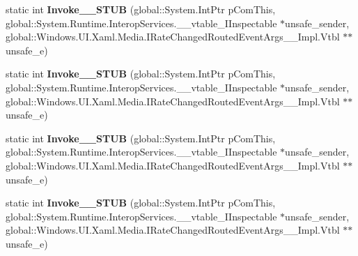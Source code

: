 \begin{DoxyCompactItemize}
\item 
\mbox{\label{struct_windows_1_1_u_i_1_1_xaml_1_1_media_1_1_rate_changed_routed_event_handler_____impl_1_1_vtbl_afcb8aa9c9ec10fdb63e0e499996bd6f5}} 
static int {\bfseries Invoke\+\_\+\+\_\+\+S\+T\+UB} (global\+::\+System.\+Int\+Ptr p\+Com\+This, global\+::\+System.\+Runtime.\+Interop\+Services.\+\_\+\+\_\+vtable\+\_\+\+I\+Inspectable $\ast$unsafe\+\_\+sender, global\+::\+Windows.\+U\+I.\+Xaml.\+Media.\+I\+Rate\+Changed\+Routed\+Event\+Args\+\_\+\+\_\+\+Impl.\+Vtbl $\ast$$\ast$unsafe\+\_\+e)
\item 
\mbox{\label{struct_windows_1_1_u_i_1_1_xaml_1_1_media_1_1_rate_changed_routed_event_handler_____impl_1_1_vtbl_afcb8aa9c9ec10fdb63e0e499996bd6f5}} 
static int {\bfseries Invoke\+\_\+\+\_\+\+S\+T\+UB} (global\+::\+System.\+Int\+Ptr p\+Com\+This, global\+::\+System.\+Runtime.\+Interop\+Services.\+\_\+\+\_\+vtable\+\_\+\+I\+Inspectable $\ast$unsafe\+\_\+sender, global\+::\+Windows.\+U\+I.\+Xaml.\+Media.\+I\+Rate\+Changed\+Routed\+Event\+Args\+\_\+\+\_\+\+Impl.\+Vtbl $\ast$$\ast$unsafe\+\_\+e)
\item 
\mbox{\label{struct_windows_1_1_u_i_1_1_xaml_1_1_media_1_1_rate_changed_routed_event_handler_____impl_1_1_vtbl_afcb8aa9c9ec10fdb63e0e499996bd6f5}} 
static int {\bfseries Invoke\+\_\+\+\_\+\+S\+T\+UB} (global\+::\+System.\+Int\+Ptr p\+Com\+This, global\+::\+System.\+Runtime.\+Interop\+Services.\+\_\+\+\_\+vtable\+\_\+\+I\+Inspectable $\ast$unsafe\+\_\+sender, global\+::\+Windows.\+U\+I.\+Xaml.\+Media.\+I\+Rate\+Changed\+Routed\+Event\+Args\+\_\+\+\_\+\+Impl.\+Vtbl $\ast$$\ast$unsafe\+\_\+e)
\item 
\mbox{\label{struct_windows_1_1_u_i_1_1_xaml_1_1_media_1_1_rate_changed_routed_event_handler_____impl_1_1_vtbl_afcb8aa9c9ec10fdb63e0e499996bd6f5}} 
static int {\bfseries Invoke\+\_\+\+\_\+\+S\+T\+UB} (global\+::\+System.\+Int\+Ptr p\+Com\+This, global\+::\+System.\+Runtime.\+Interop\+Services.\+\_\+\+\_\+vtable\+\_\+\+I\+Inspectable $\ast$unsafe\+\_\+sender, global\+::\+Windows.\+U\+I.\+Xaml.\+Media.\+I\+Rate\+Changed\+Routed\+Event\+Args\+\_\+\+\_\+\+Impl.\+Vtbl $\ast$$\ast$unsafe\+\_\+e)

\end{DoxyCompactItemize}
